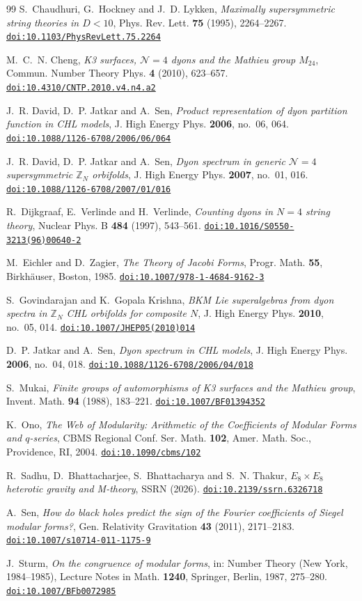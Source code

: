 \documentclass[11pt]{amsart}
\theoremstyle{definition}
\newcommand{\ZZ}{\mathbb{Z}}
\newcommand{\doi}[1]{\href{https://doi.org/#1}{\nolinkurl{doi:#1}}}
\begin{document}
\begin{thebibliography}{99}
 S.~Chaudhuri, G.~Hockney and J.~D. Lykken, \emph{Maximally supersymmetric string theories in $D<10$}, Phys. Rev. Lett. \textbf{75} (1995), 2264--2267. \doi{10.1103/PhysRevLett.75.2264}

 M.~C.~N. Cheng, \emph{K3 surfaces, $\mathcal N=4$ dyons and the Mathieu group $M_{24}$}, Commun. Number Theory Phys. \textbf{4} (2010), 623--657. \doi{10.4310/CNTP.2010.v4.n4.a2}

 J.~R. David, D.~P. Jatkar and A.~Sen, \emph{Product representation of dyon partition function in CHL models}, J. High Energy Phys. \textbf{2006}, no.~06, 064. \doi{10.1088/1126-6708/2006/06/064}

 J.~R. David, D.~P. Jatkar and A.~Sen, \emph{Dyon spectrum in generic $\mathcal N=4$ supersymmetric $\ZZ_N$ orbifolds}, J. High Energy Phys. \textbf{2007}, no.~01, 016. \doi{10.1088/1126-6708/2007/01/016}

 R.~Dijkgraaf, E.~Verlinde and H.~Verlinde, \emph{Counting dyons in $N=4$ string theory}, Nuclear Phys. B \textbf{484} (1997), 543--561. \doi{10.1016/S0550-3213(96)00640-2}

 M.~Eichler and D.~Zagier, \emph{The Theory of Jacobi Forms}, Progr. Math. \textbf{55}, Birkh\"auser, Boston, 1985. \doi{10.1007/978-1-4684-9162-3}

 S.~Govindarajan and K.~Gopala Krishna, \emph{BKM Lie superalgebras from dyon spectra in $\ZZ_N$ CHL orbifolds for composite $N$}, J. High Energy Phys. \textbf{2010}, no.~05, 014. \doi{10.1007/JHEP05(2010)014}

 D.~P. Jatkar and A.~Sen, \emph{Dyon spectrum in CHL models}, J. High Energy Phys. \textbf{2006}, no.~04, 018. \doi{10.1088/1126-6708/2006/04/018}

 S.~Mukai, \emph{Finite groups of automorphisms of K3 surfaces and the Mathieu group}, Invent. Math. \textbf{94} (1988), 183--221. \doi{10.1007/BF01394352}

 K.~Ono, \emph{The Web of Modularity: Arithmetic of the Coefficients of Modular Forms and $q$-series}, CBMS Regional Conf. Ser. Math. \textbf{102}, Amer. Math. Soc., Providence, RI, 2004. \doi{10.1090/cbms/102}

 R.~Sadhu, D.~Bhattacharjee, S.~Bhattacharya and S.~N. Thakur, \emph{$E_8\times E_8$ heterotic gravity and M-theory}, SSRN (2026). \doi{10.2139/ssrn.6326718}

 A.~Sen, \emph{How do black holes predict the sign of the Fourier coefficients of Siegel modular forms?}, Gen. Relativity Gravitation \textbf{43} (2011), 2171--2183. \doi{10.1007/s10714-011-1175-9}

 J.~Sturm, \emph{On the congruence of modular forms}, in: Number Theory (New York, 1984--1985), Lecture Notes in Math. \textbf{1240}, Springer, Berlin, 1987, 275--280. \doi{10.1007/BFb0072985}

\end{thebibliography}
\end{document}
